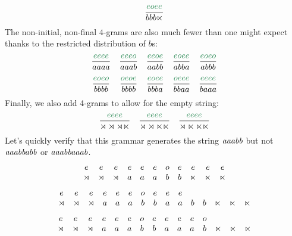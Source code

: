 \begin{examplebox}
\[\begin{array}{cccc}
            \kState{eoee}{b b b \RightEdge}
        \end{array}
    \]
    The non-initial, non-final $4$-grams are also much fewer than one might expect thanks to the restricted distribution of $b$s:
    \[
        \begin{array}{ccccc}
            \kState{eeee}{aaaa} &
            \kState{eeeo}{aaab} &
            \kState{eeoe}{aabb} &
            \kState{eoee}{abba} &
            \kState{eoeo}{abbb}
            \\[12pt]
            \kState{eoeo}{bbbb} &
            \kState{oeoe}{bbbb} &
            \kState{eoee}{bbba} &
            \kState{oeee}{bbaa} &
            \kState{eeee}{baaa}
        \end{array}
    \]
    Finally, we also add 4-grams to allow for the empty string:
    \[
        \begin{array}{ccc}
            \kState{eeee}{\LeftEdge \LeftEdge \LeftEdge \RightEdge} &
            \kState{eeee}{\LeftEdge \LeftEdge \RightEdge \RightEdge} &
            \kState{eeee}{\LeftEdge \RightEdge \RightEdge \RightEdge}
        \end{array}
    \]
    Let's quickly verify that this grammar generates the string $\mathit{aaabb}$ but not $\mathit{aaabbabb}$ or $\mathit{aaabbaaab}$.
    \[
        \begin{array}{ccccccccccc}
                e & e & e & e & e & e & o & e & e & e & e\\
                \rtimes & \rtimes & \rtimes & a & a & a & b & b & \ltimes & \ltimes & \ltimes
        \end{array}
    \]
    \[ 
        \begin{array}{ccccccccccccccc}
                e & e & e & e & e & e & o & e & e & e & & & & &\\
                \rtimes & \rtimes & \rtimes & a & a & a & b & b & a & a & b & b &\ltimes & \ltimes & \ltimes
        \end{array}
    \]
    \[ 
        \begin{array}{ccccccccccccccc}
                e & e & e & e & e & e & o & e & e & e & e & o & & &\\
                \rtimes & \rtimes & \rtimes & a & a & a & b & b & a & a & a & b &\ltimes & \ltimes & \ltimes
        \end{array}
    \]
    

\end{examplebox}
